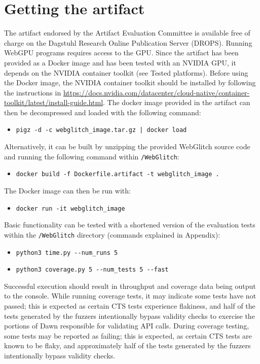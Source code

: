 \documentclass[a4paper,UKenglish]{darts-v2021}
\newenvironment{getting}{\section{Getting the artifact} The artifact 
endorsed by the Artifact Evaluation Committee is available free of 
charge on the Dagstuhl Research Online Publication Server (DROPS).}{}
\begin{document}
\begin{getting}
Running WebGPU programs requires access to the GPU. Since the artifact has been provided as a Docker image and has been tested with an NVIDIA GPU, it depends on the NVIDIA container toolkit (see Tested platforms).
Before using the Docker image, the NVIDIA container toolkit should be installed by following the instructions in \url{https://docs.nvidia.com/datacenter/cloud-native/container-toolkit/latest/install-guide.html}.
The docker image provided in the artifact can then be decompressed and loaded with the following command:
\begin{itemize}
    \item \texttt{pigz -d -c webglitch\_image.tar.gz | docker load}
\end{itemize}
Alternatively, it can be built by unzipping the provided WebGlitch source code and running the following command within \texttt{/WebGlitch}:
\begin{itemize}
    \item \texttt{docker build -f Dockerfile.artifact -t webglitch\_image .}
\end{itemize}
The Docker image can then be run with:
\begin{itemize}
    \item \texttt{docker run -it webglitch\_image}
\end{itemize}
Basic functionality can be tested with a shortened version of the evaluation tests within the \texttt{/WebGlitch} directory (commands explained in Appendix):
\begin{itemize}
    \item \texttt{python3 time.py -{}-num\_runs 5}
    \item \texttt{python3 coverage.py 5 -{}-num\_tests 5 -{}-fast}
\end{itemize}
\end{getting}
Successful execution should result in throughput and coverage data being output to the console. While running coverage tests, it may indicate some tests have not passed; this is expected as certain CTS tests experience flakiness, and half of the tests generated by the fuzzers intentionally bypass validity checks to exercise the portions of Dawn responsible for validating API calls.
During coverage testing, some tests may be reported as failing; this is expected, as certain CTS tests are known to be flaky, and approximately half of the tests generated by the fuzzers intentionally bypass validity checks.
\end{document}
